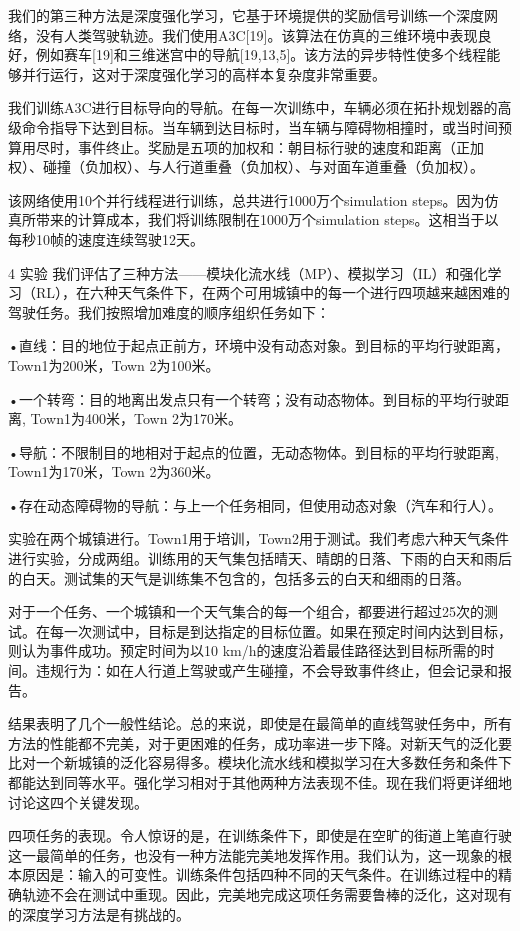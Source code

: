 我们的第三种方法是深度强化学习，它基于环境提供的奖励信号训练一个深度网络，没有人类驾驶轨迹。我们使用A3C[19]。该算法在仿真的三维环境中表现良好，例如赛车[19]和三维迷宫中的导航[19,13,5]。该方法的异步特性使多个线程能够并行运行，这对于深度强化学习的高样本复杂度非常重要。

我们训练A3C进行目标导向的导航。在每一次训练中，车辆必须在拓扑规划器的高级命令指导下达到目标。当车辆到达目标时，当车辆与障碍物相撞时，或当时间预算用尽时，事件终止。奖励是五项的加权和：朝目标行驶的速度和距离（正加权）、碰撞（负加权）、与人行道重叠（负加权）、与对面车道重叠（负加权）。

该网络使用10个并行线程进行训练，总共进行1000万个simulation steps。因为仿真所带来的计算成本，我们将训练限制在1000万个simulation steps。这相当于以每秒10帧的速度连续驾驶12天。


4 实验
我们评估了三种方法——模块化流水线（MP）、模拟学习（IL）和强化学习（RL），在六种天气条件下，在两个可用城镇中的每一个进行四项越来越困难的驾驶任务。我们按照增加难度的顺序组织任务如下：

•直线：目的地位于起点正前方，环境中没有动态对象。到目标的平均行驶距离，Town1为200米，Town 2为100米。

•一个转弯：目的地离出发点只有一个转弯；没有动态物体。到目标的平均行驶距离, Town1为400米，Town 2为170米。

•导航：不限制目的地相对于起点的位置，无动态物体。到目标的平均行驶距离, Town1为170米，Town 2为360米。

•存在动态障碍物的导航：与上一个任务相同，但使用动态对象（汽车和行人）。

实验在两个城镇进行。Town1用于培训，Town2用于测试。我们考虑六种天气条件进行实验，分成两组。训练用的天气集包括晴天、晴朗的日落、下雨的白天和雨后的白天。测试集的天气是训练集不包含的，包括多云的白天和细雨的日落。

对于一个任务、一个城镇和一个天气集合的每一个组合，都要进行超过25次的测试。在每一次测试中，目标是到达指定的目标位置。如果在预定时间内达到目标，则认为事件成功。预定时间为以10 km/h的速度沿着最佳路径达到目标所需的时间。违规行为：如在人行道上驾驶或产生碰撞，不会导致事件终止，但会记录和报告。

结果表明了几个一般性结论。总的来说，即使是在最简单的直线驾驶任务中，所有方法的性能都不完美，对于更困难的任务，成功率进一步下降。对新天气的泛化要比对一个新城镇的泛化容易得多。模块化流水线和模拟学习在大多数任务和条件下都能达到同等水平。强化学习相对于其他两种方法表现不佳。现在我们将更详细地讨论这四个关键发现。

四项任务的表现。令人惊讶的是，在训练条件下，即使是在空旷的街道上笔直行驶这一最简单的任务，也没有一种方法能完美地发挥作用。我们认为，这一现象的根本原因是：输入的可变性。训练条件包括四种不同的天气条件。在训练过程中的精确轨迹不会在测试中重现。因此，完美地完成这项任务需要鲁棒的泛化，这对现有的深度学习方法是有挑战的。

